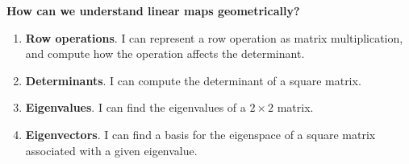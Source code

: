 \begin{multicols}{2}
\noindent\textbf{How can we understand linear maps geometrically?}
\begin{enumerate}
\item {\bf Row operations}.  I can represent a row operation as matrix multiplication, and compute how the operation affects the determinant.
\item {\bf Determinants}. I can compute the determinant of a square matrix.
\item {\bf Eigenvalues}. I can find the eigenvalues of a $2\times 2$ matrix.
\item {\bf Eigenvectors}. I can find a basis for the eigenspace of a square matrix associated with a given eigenvalue.
\end{enumerate}

\end{multicols}



